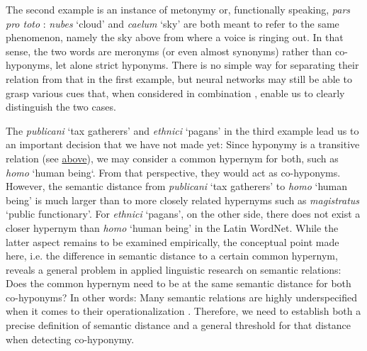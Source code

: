 The second example is an instance of metonymy or, functionally speaking, \textit{pars pro toto} \parencite[44]{gardenforsSemanticTransformations2015}: \textit{nubes} `cloud' and \textit{caelum} `sky' are both meant to refer to the same phenomenon, namely the sky above from where a voice is ringing out. In that sense, the two words are meronyms (or even almost synonyms) rather than co-hyponyms, let alone strict hyponyms. There is no simple way for separating their relation from that in the first example, but neural networks may still be able to grasp various cues that, when considered in combination \parencite[1]{hintonImprovingNeuralNetworks2012}, enable us to clearly distinguish the two cases.

The \textit{publicani} `tax gatherers' and \textit{ethnici} `pagans' in the third example lead us to an important decision that we have not made yet: Since hyponymy is a transitive relation (see \hyperref[transitivity]{above}), we may consider a common hypernym for both, such as \textit{homo} `human being`. From that perspective, they would act as co-hyponyms. However, the semantic distance from \textit{publicani} `tax gatherers' to \textit{homo} `human being' is much larger than to more closely related hypernyms such as \textit{magistratus} `public functionary'. For \textit{ethnici} `pagans', on the other side, there does not exist a closer hypernym than \textit{homo} `human being' in the Latin WordNet. While the latter aspect remains to be examined empirically, the conceptual point made here, i.e. the difference in semantic distance to a certain common hypernym, reveals a general problem in applied linguistic research on semantic relations: Does the common hypernym need to be at the same semantic distance for both co-hyponyms? In other words: Many semantic relations are highly underspecified when it comes to their operationalization \parencite[5]{baroniHowWeBLESSed2011}. Therefore, we need to establish both a precise definition of semantic distance and a general threshold for that distance when detecting co-hyponymy.

